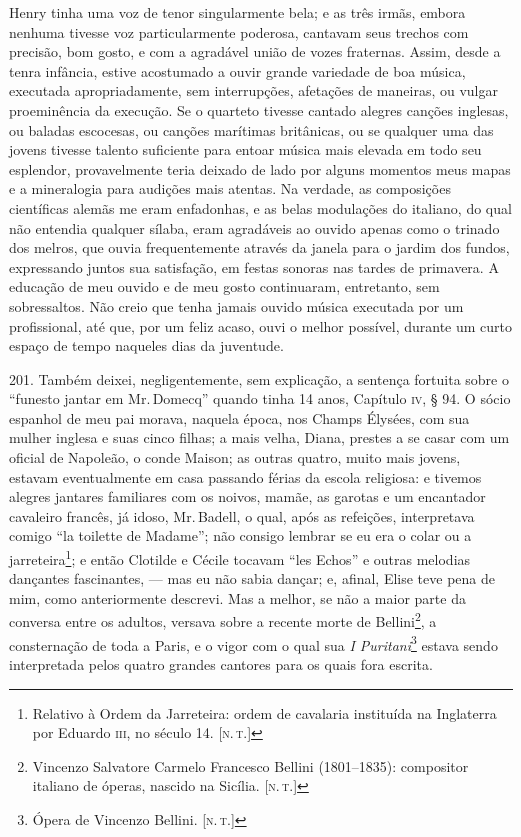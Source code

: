 Henry tinha uma voz de tenor singularmente bela; e as três irmãs, embora
nenhuma tivesse voz particularmente poderosa, cantavam seus trechos com
precisão, bom gosto, e com a agradável união de vozes fraternas. Assim,
desde a tenra infância, estive acostumado a ouvir grande variedade de
boa música, executada apropriadamente, sem interrupções, afetações de
maneiras, ou vulgar proeminência da execução. Se o quarteto tivesse
cantado alegres canções inglesas, ou baladas escocesas, ou canções
marítimas britânicas, ou se qualquer uma das jovens tivesse talento
suficiente para entoar música mais elevada em todo seu esplendor,
provavelmente teria deixado de lado por alguns momentos meus mapas e a
mineralogia para audições mais atentas. Na verdade, as composições
científicas alemãs me eram enfadonhas, e as belas modulações do
italiano, do qual não entendia qualquer sílaba, eram agradáveis ao
ouvido apenas como o trinado dos melros, que ouvia frequentemente
através da janela para o jardim dos fundos, expressando juntos sua
satisfação, em festas sonoras nas tardes de primavera. A educação de meu
ouvido e de meu gosto continuaram, entretanto, sem sobressaltos. Não
creio que tenha jamais ouvido música executada por um profissional, até
que, por um feliz acaso, ouvi o melhor possível, durante um curto espaço
de tempo naqueles dias da juventude.

201. Também deixei, negligentemente, sem explicação, a sentença fortuita
sobre o ``funesto jantar em Mr.\,Domecq'' quando tinha 14 anos, Capítulo
\textsc{iv}, § 94. O sócio espanhol de meu pai morava, naquela época, nos Champs
Élysées, com sua mulher inglesa e suas cinco filhas; a mais velha,
Diana, prestes a se casar com um oficial de Napoleão, o conde Maison; as
outras quatro, muito mais jovens, estavam eventualmente em casa passando
férias da escola religiosa: e tivemos alegres jantares familiares com os
noivos, mamãe, as garotas e um encantador cavaleiro francês, já idoso,
Mr.\,Badell, o qual, após as refeições, interpretava comigo ``la toilette
de Madame''; não consigo lembrar se eu era o colar ou a
jarreteira\footnote{Relativo à Ordem da Jarreteira: ordem de cavalaria
  instituída na Inglaterra por Eduardo \textsc{iii}, no século 14. {[}\textsc{n.\,t.}{]}};
e então Clotilde e Cécile tocavam ``les Echos'' e outras melodias
dançantes fascinantes, --- mas eu não sabia dançar; e, afinal, Elise teve
pena de mim, como anteriormente descrevi. Mas a melhor, se não a maior
parte da conversa entre os adultos, versava sobre a recente morte de
Bellini\footnote{Vincenzo Salvatore Carmelo Francesco Bellini
  (1801--1835): compositor italiano de óperas, nascido na Sicília. {[}\textsc{n.\,t.}{]}}, a consternação de toda a Paris, e o vigor com o qual sua
\emph{I Puritani}\footnote{Ópera de Vincenzo Bellini. {[}\textsc{n.\,t.}{]}}
estava sendo interpretada pelos quatro grandes cantores para os quais
fora escrita.

